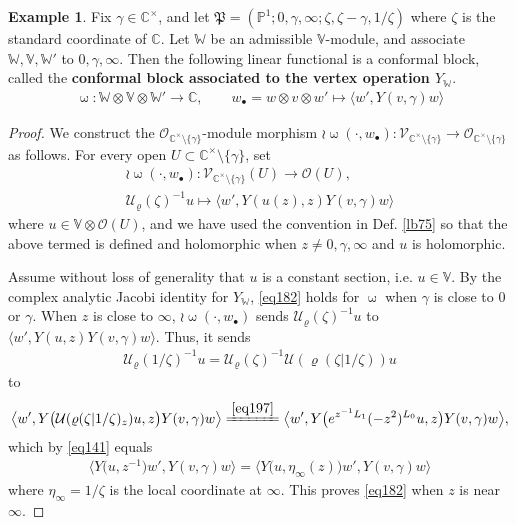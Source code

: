 \documentclass[12pt,a4paper,notitlepage]{article}
\theoremstyle{definition}
\newtheorem{eg}[df]{Example}
\theoremstyle{plain}
\newcommand{\fk}{\mathfrak}
\newcommand{\mc}{\mathcal}
\newcommand{\bk}[1]{\langle {#1}\rangle}
\newcommand{\bigbk}[1]{\big\langle {#1}\big\rangle}
\newcommand{\scr}{\mathscr}
\newcommand{\blt}{\bullet}
\newcommand{\Vbb}{\mathbb V}
\newcommand{\Wbb}{\mathbb W}
\newcommand{\Cbb}{\mathbb C}
\newcommand{\Pbb}{\mathbb P}
\numberwithin{equation}{section}
\begin{document}
\begin{eg}\label{lb173}
Fix $\gamma\in\Cbb^\times$, and let $\fk P=(\Pbb^1;0,\gamma,\infty;\zeta,\zeta-\gamma,1/\zeta)$ where $\zeta$ is the standard coordinate of $\Cbb$. Let $\Wbb$ be an admissible $\Vbb$-module, and associate $\Wbb,\Vbb,\Wbb'$ to $0,\gamma,\infty$. Then the following linear functional is a conformal block, called the \textbf{conformal block associated to the vertex operation $Y_\Wbb$}.
\begin{gather}
\upomega:\Wbb\otimes\Vbb\otimes\Wbb'\rightarrow\Cbb,\qquad w_\blt=w\otimes v\otimes w'\mapsto \bk{w',Y(v,\gamma)w}
\end{gather}



\end{eg}


\begin{proof}
We construct the $\scr O_{\Cbb^\times\setminus\{\gamma\}}$-module morphism $\wr\upomega(\cdot,w_\blt):\scr V_{\Cbb^\times\setminus\{\gamma\}}\rightarrow\scr O_{\Cbb^\times\setminus\{\gamma\}}$ as follows. For every open $U\subset \Cbb^\times\setminus\{\gamma\}$, set
\begin{gather*}
\wr\upomega(\cdot,w_\blt):\scr V_{\Cbb^\times\setminus\{\gamma\}}(U)\rightarrow\scr O(U),\\
\mc U_\varrho(\zeta)^{-1}u\mapsto \bk{w',Y(u(z),z)Y(v,\gamma)w}
\end{gather*}
where $u\in\Vbb\otimes\scr O(U)$, and we have used the convention in Def. \ref{lb75} so that the above termed is defined and holomorphic when $z\neq 0,\gamma,\infty$ and $u$ is holomorphic.

Assume without loss of generality that $u$ is a constant section, i.e. $u\in\Vbb$. By the complex analytic Jacobi identity for $Y_\Wbb$,  \eqref{eq182} holds for $\upomega$ when $\gamma$ is close to $0$ or $\gamma$. When $z$ is close to $\infty$,  $\wr\upomega(\cdot,w_\blt)$ sends $\mc U_\varrho(\zeta)^{-1}u$ to $\bk{w',Y(u,z)Y(v,\gamma)w}$. Thus, it sends
\begin{align*}
\mc U_\varrho(1/\zeta)^{-1}u=\mc U_\varrho(\zeta)^{-1}\mc U(\varrho(\zeta|1/\zeta))u
\end{align*}
to
\begin{align*}
\bigbk{w',Y\big(\mc U(\varrho(\zeta|1/\zeta)_z)u,z\big)Y(v,\gamma)w}\xlongequal{\eqref{eq197}} \bigbk{w',Y\big(e^{z^{-1}L_1}(-z^2)^{L_0}u,z\big)Y(v,\gamma)w},
\end{align*}
which by \eqref{eq141} equals
\begin{align*}
\bigbk{Y\big(u,z^{-1}\big)w',Y(v,\gamma)w}=\bigbk{Y\big(u,\eta_\infty(z)\big)w',Y(v,\gamma)w}
\end{align*}
where $\eta_\infty=1/\zeta$ is the local coordinate at $\infty$. This proves \eqref{eq182} when $z$ is near $\infty$. 
\end{proof}
\end{document}
